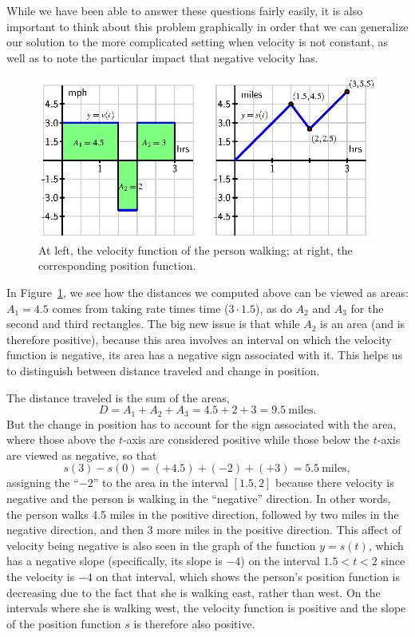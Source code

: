 While we have been able to answer these questions fairly easily, it is also important to think about this problem graphically in order that we can generalize our solution to the more complicated setting when velocity is not constant, as well as to note the particular impact that negative velocity has.
\begin{figure}[h]
\begin{center}
\includegraphics{figures/4_1_NegVel.eps}
\caption{At left, the velocity function of the person walking; at right, the corresponding position function.} \label{F:4.1.NegVel}
\end{center}
\end{figure}
In Figure~\ref{F:4.1.NegVel}, we see how the distances we computed above can be viewed as areas:  $A_1 = 4.5$ comes from taking rate times time ($3 \cdot 1.5$), as do $A_2$ and $A_3$ for the second and third rectangles.  The big new issue is that while $A_2$ is an area (and is therefore positive), because this area involves an interval on which the velocity function is negative, its area has a negative sign associated with it.  This helps us to distinguish between distance traveled and change in position.

The distance traveled is the sum of the areas, $$D = A_1 + A_2 + A_3 = 4.5 + 2 + 3 = 9.5 \ \mbox{miles}.$$ But the change in position has to account for the sign associated with the area, where those above the $t$-axis are considered positive while those below the $t$-axis are viewed as negative, so that 
$$s(3) - s(0) = (+4.5) + (-2) + (+3) = 5.5 \ \mbox{miles},$$
assigning the ``$-2$'' to the area in the interval $[1.5,2]$ because there velocity is negative and the person is walking in the ``negative'' direction.  In other words, the person walks 4.5 miles in the positive direction, followed by two miles in the negative direction, and then 3 more miles in the positive direction.  This affect of velocity being negative is also seen in the graph of the function $y=s(t)$, which has a negative slope (specifically, its slope is $-4$) on the interval $1.5<t<2$ since the velocity is $-4$ on that interval, which shows the person's position function is decreasing due to the fact that she is walking east, rather than west.  On the intervals where she is walking west, the velocity function is positive and the slope of the position function $s$ is therefore also positive.

